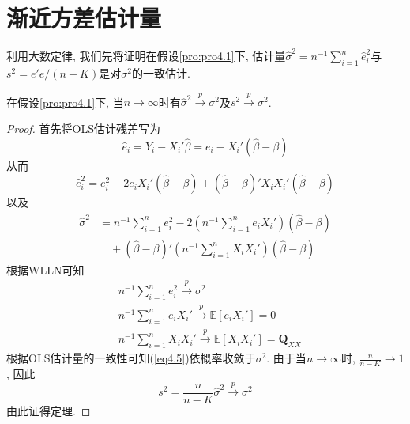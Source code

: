 \documentclass[cn, 12pt, math=mtpro2, bibstyle=apa, blue, twocol]{elegantbook}
\newcommand{\E}{\mathbb{E}}
\newcommand{\Q}{\mathbold{Q}}
\newcommand{\hb}{\hat{\beta}}
\begin{document}
\section{渐近方差估计量}
利用大数定律, 我们先将证明在假设\ref{pro:pro4.1}下, 估计量$\hat{\sigma}^2=n^{-1}\sum_{i=1}^{n}\hat{e}_i^2$与$s^2=e'e/(n-K)$是对$\sigma^2$的一致估计.
\begin{theorem}\label{thm:thm4.3}
  在假设\ref{pro:pro4.1}下, 当$n\to\infty$时有$\hat{\sigma}^2\xrightarrow{p}\sigma^2$及$s^2\xrightarrow{p}\sigma^2$.
\end{theorem}
\begin{proof}
  首先将OLS估计残差写为
  $$\hat{e}_i=Y_i-X_i'\hat{\beta}=e_i-X_i'(\hb-\beta)$$
  从而
  \begin{equation}\label{eq4.6}
    \hat{e}_i^2=e_i^2-2e_iX_i'(\hb-\beta)+(\hb-\beta)'X_iX_i'(\hb-\beta)
  \end{equation}
  以及
  \begin{align}
      \hat{\sigma}^2&=n^{-1}\sum_{i=1}^{n}e_i^2-2\left(n^{-1}\sum_{i=1}^{n}e_iX_i'\right)(\hb-\beta) \nonumber \\
      &\quad +(\hb-\beta)'\left(n^{-1}\sum_{i=1}^{n}X_iX_i'\right)(\hb-\beta) \label{eq4.5}
  \end{align}
  根据WLLN可知
  \begin{align*}
  &n^{-1}\sum_{i=1}^{n}e_i^2\xrightarrow{p}\sigma^2\\
  &n^{-1}\sum_{i=1}^{n}e_iX_i'\xrightarrow{p}\E[e_iX_i']=0 \\
  &n^{-1}\sum_{i=1}^{n}X_iX_i'\xrightarrow{p}\E[X_iX_i']=\Q_{XX}
  \end{align*}
  根据OLS估计量的一致性可知(\ref{eq4.5})依概率收敛于$\sigma^2$. 由于当$n\to\infty$时, $\displaystyle\frac{n}{n-K}\to1$, 因此
  $$s^2=\frac{n}{n-K}\hat{\sigma}^2\xrightarrow{p}\sigma^2$$
  由此证得定理.
\end{proof}
\end{document}
